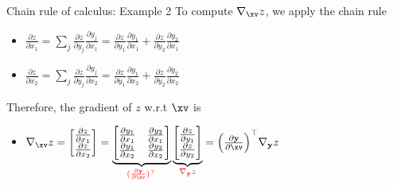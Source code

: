 \begin{frame}{Chain rule of calculus: Example 2}
To compute $\nabla_\xv z$, we apply the chain rule %
  \begin{itemize}
    \item $\frac {\partial z}{\partial x_1} = \sum_j \frac{\partial z}{\partial y_j} \frac{\partial y_j}{\partial x_1} = \frac {\partial z}{\partial y_1} \frac {\partial y_1}{\partial x_1} + \frac {\partial z}{\partial y_2} \frac {\partial y_2}{\partial x_1}$
    \item $\frac {\partial z}{\partial x_2} = \sum_j \frac{\partial z}{\partial y_j} \frac{\partial y_j}{\partial x_2} = \frac {\partial z}{\partial y_1} \frac {\partial y_1}{\partial x_2} + \frac {\partial z}{\partial y_2} \frac {\partial y_2}{\partial x_2}$
  \end{itemize}
  \vspace{2mm}
    Therefore, the gradient of $z$ w.r.t $\xv$ is
    \begin{itemize}
      \item  $\nabla_\xv z = \begin{bmatrix}
               \frac {\partial z}{\partial x_1} \\
               \frac {\partial z}{\partial x_2} \\
             \end{bmatrix} = \underbrace{\begin{bmatrix} \frac{\partial y_1}{\partial x_1}&\frac {\partial y_2}{\partial x_1}\\
                                             \frac {\partial y_1}{\partial x_2}&\frac {\partial y_2}{\partial x_2}\\
             \end{bmatrix}}_{\textcolor{red}{(\frac{\partial \mathbf{y}}{\partial \xv})^\top}} \underbrace{\begin{bmatrix} \frac {\partial z}{\partial y_1} \\
            \frac {\partial z}{\partial y_2} \\ \end{bmatrix}}_{\textcolor{red}{\nabla_{\mathbf{y}} z}} = \Big(\frac{\partial \mathbf{y}}{\partial \xv}\Big)^\top \nabla_{\mathbf{y}} z $
  \end{itemize}
\end{frame}



